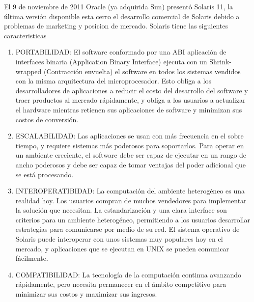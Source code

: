\documentclass[paper=a4, fontsize=12pt]{article} 		%
\numberwithin{equation}{section}						%
\numberwithin{table}{section} 							%
\begin{document}
El 9 de noviembre de 2011 Oracle (ya adquirida Sun) presentó Solaris 11, la última versión disponible esta cerro el desarrollo comercial de Solaris debido a problemas de marketing y posicion de mercado. 
Solaris tiene las siguientes caracteristicas 
\begin{enumerate}
\item PORTABILIDAD: El software conformado por una ABI aplicación de interfaces binaria (Application Binary Interface) ejecuta con un Shrink-wrapped (Contracción envuelta) el software en todos los sistemas vendidos con la misma arquitectura del microprocesador. Esto obliga a los desarrolladores de aplicaciones a reducir el costo del desarrollo del software y traer productos al mercado rápidamente, y obliga a los usuarios a actualizar el hardware mientras retienen sus aplicaciones de software y minimizan sus costos de conversión.
\item ESCALABILIDAD: Las aplicaciones se usan con más frecuencia en el sobre tiempo, y requiere sistemas más poderosos para soportarlos. Para operar en un ambiente creciente, el software debe ser capaz de ejecutar en un rango de ancho poderosos y debe ser capaz de tomar ventajas del poder adicional que se está procesando.
\item INTEROPERATIBIDAD: La computación del ambiente heterogéneo es una realidad hoy. Los usuarios compran de muchos vendedores para implementar la solución que necesitan. La estandarización y una clara interface son criterios para un ambiente heterogéneo, permitiendo a los usuarios desarrollar estrategias para comunicarse por medio de su red. El sistema operativo de Solaris puede interoperar con unos sistemas muy populares hoy en el mercado, y aplicaciones que se ejecutan en UNIX se pueden comunicar fácilmente.
\item COMPATIBILIDAD: La tecnología de la computación continua avanzando rápidamente, pero necesita permanecer en el ámbito competitivo para minimizar sus costos y maximizar sus ingresos.
\end{enumerate}
\end{document}

